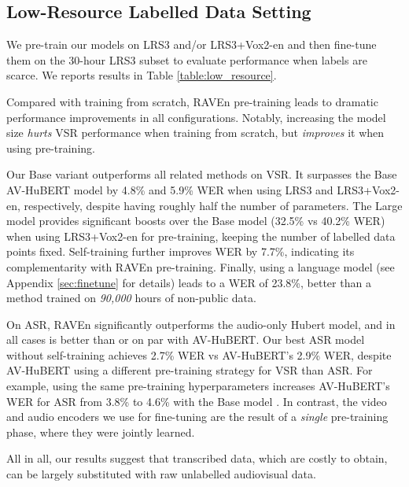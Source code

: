 \documentclass{article} \usepackage{iclr2023_conference,times}
\begin{document}
\subsection{Low-Resource Labelled Data Setting}
We pre-train our models on LRS3 and/or LRS3+Vox2-en and then fine-tune them on the 30-hour LRS3 subset to evaluate performance when labels are scarce. We reports results in Table \ref{table:low_resource}.

Compared with training from scratch, RAVEn pre-training leads to dramatic performance improvements in all configurations. Notably, increasing the model size \textit{hurts} VSR performance when training from scratch, but \textit{improves} it when using pre-training. 

Our Base variant outperforms all related methods on VSR. It surpasses the Base AV-HuBERT model by 4.8\% and 5.9\% WER when using LRS3 and LRS3+Vox2-en, respectively, despite having roughly half the number of parameters. The Large model provides significant boosts over the Base model (32.5\% vs 40.2\% WER) when using LRS3+Vox2-en for pre-training, keeping the number of labelled data points fixed. Self-training further improves WER by 7.7\%, indicating its complementarity with RAVEn pre-training. Finally, using a language model (see Appendix \ref{sec:finetune} for details) leads to a WER of 23.8\%, better than a method \citep{serdyuk2021audio} trained on \textit{90,000} hours of non-public data.

On ASR, RAVEn significantly outperforms the audio-only Hubert \citep{hsu2021hubert} model, and in all cases is better than or on par with AV-HuBERT. Our best ASR model without self-training achieves 2.7\% WER vs AV-HuBERT's 2.9\% WER, despite AV-HuBERT using a different pre-training strategy for VSR than ASR. For example, using the same pre-training hyperparameters increases AV-HuBERT's WER for ASR from 3.8\% to 4.6\% with the Base model \citep{shi2022learning}. In contrast, the video and audio encoders we use for fine-tuning are the result of a \textit{single} pre-training phase, where they were jointly learned. 

All in all, our results suggest that transcribed data, which are costly to obtain, can be largely substituted with raw unlabelled audiovisual data. 
\end{document}
